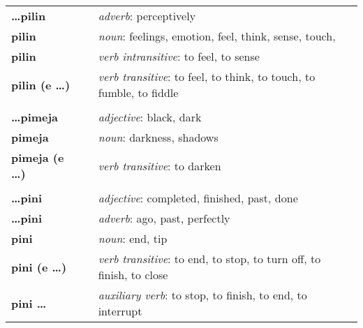 \begin{supertabular}{p{2,5cm}|ll}
    \textbf{\dots pilin}         &  & \textit{adverb}: perceptively                                                                              \\
    \textbf{pilin}               &  & \textit{noun}: feelings, emotion, feel, think, sense, touch,                                               \\
    \textbf{pilin}               &  & \textit{verb intransitive}: to feel, to sense                                                              \\
    \textbf{pilin (e \dots)}     &  & \textit{verb transitive}: to feel, to think, to touch, to fumble, to fiddle                                \\
                                 &  &                                                                                                            \\ %
    \textbf{\dots pimeja}        &  & \textit{adjective}: black, dark                                                                            \\
    \textbf{pimeja}              &  & \textit{noun}: darkness, shadows                                                                           \\
    \textbf{pimeja (e \dots)}    &  & \textit{verb transitive}: to darken                                                                        \\
                                 &  &                                                                                                            \\ %
    \textbf{\dots pini}          &  & \textit{adjective}: completed, finished, past, done                                                        \\
    \textbf{\dots pini}          &  & \textit{adverb}: ago, past, perfectly                                                                      \\
    \textbf{pini}                &  & \textit{noun}: end, tip                                                                                    \\
    \textbf{pini (e \dots)}      &  & \textit{verb transitive}: to end, to stop, to turn off, to finish, to close                                \\
    \textbf{pini \dots }         &  & \textit{auxiliary verb}: to stop, to finish, to end, to interrupt                                          \\

\end{supertabular}
